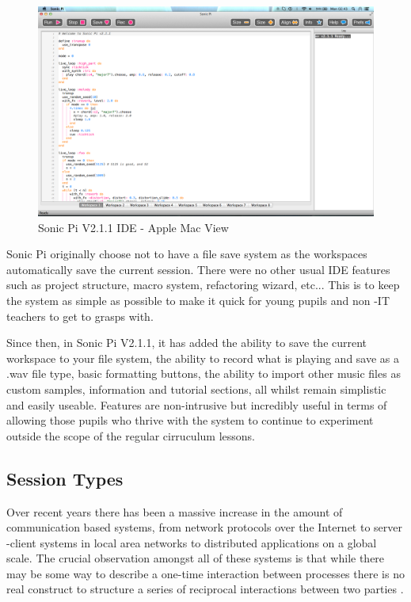\documentclass[11pt, abstracton, twoside, titlepage=true]{scrartcl}
\begin{document}
\begin{figure}[t]
	\centering
	\includegraphics[width=\textwidth]{images/sonic-ide.png}
	\caption{Sonic Pi V2.1.1 IDE - Apple Mac View} \label{macview}
\end{figure}

Sonic Pi originally choose not to have a file save system as the workspaces 
automatically save the current session. There were no other usual IDE features 
such as project structure, macro system, refactoring wizard, etc... This is to 
keep the system as simple as possible to make it quick for young pupils and non
-IT teachers to get to grasps with.

Since then, in Sonic Pi V2.1.1, it has added the ability to save the current 
workspace to your file system, the ability to record what is playing and save 
as a .wav file type, basic formatting buttons, the ability to import other 
music files as custom samples, information and tutorial sections, all whilst 
remain simplistic and easily useable. Features are non-intrusive but 
incredibly useful in terms of allowing those pupils who thrive with the system 
to continue to experiment outside the scope of the regular cirruculum lessons.

\subsection{Session Types}
Over recent years there has been a massive increase in the amount of 
communication based systems, from network protocols over the Internet to server
-client systems in local area networks to distributed applications on a global 
scale. The crucial observation amongst all of these systems is that while 
there may be some way to describe a one-time interaction between processes 
there is no real construct to structure a series of reciprocal interactions 
between two parties \cite{HVM98}.
\end{document}
